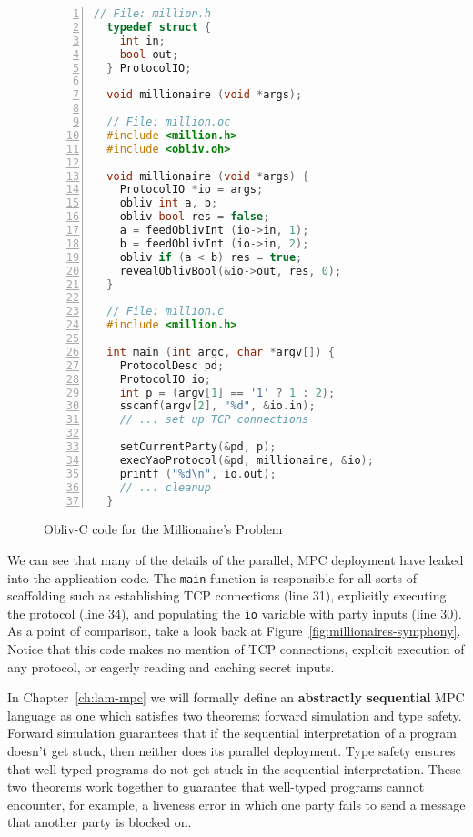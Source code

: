 \begin{figure}[h]
\begin{lstlisting}[language=c,basicstyle=\footnotesize\ttfamily,numbers=left,stepnumber=1]
  // File: million.h
  typedef struct {
    int in;
    bool out;
  } ProtocolIO;

  void millionaire (void *args);

  // File: million.oc
  #include <million.h>
  #include <obliv.oh>

  void millionaire (void *args) {
    ProtocolIO *io = args;
    obliv int a, b;
    obliv bool res = false;
    a = feedOblivInt (io->in, 1);
    b = feedOblivInt (io->in, 2);
    obliv if (a < b) res = true;
    revealOblivBool(&io->out, res, 0);
  }

  // File: million.c
  #include <million.h>

  int main (int argc, char *argv[]) {
    ProtocolDesc pd;
    ProtocolIO io;
    int p = (argv[1] == '1' ? 1 : 2);
    sscanf(argv[2], "%d", &io.in);
    // ... set up TCP connections

    setCurrentParty(&pd, p);
    execYaoProtocol(&pd, millionaire, &io);
    printf ("%d\n", io.out);
    // ... cleanup
  }
\end{lstlisting}
\caption{Obliv-C code for the Millionaire's Problem}
\label{fig:millionaires-oblivc}
\end{figure}

We can see that many of the details of the parallel, MPC deployment have leaked into the application code. The
\lstinline[language=c,basicstyle=\ttfamily]{main} function is responsible for all sorts of scaffolding such as establishing TCP connections (line 31),
explicitly executing the protocol (line 34), and populating the \lstinline[language=c,basicstyle=\ttfamily]{io} variable with party inputs (line 30). As
a point of comparison, take a look back at Figure~\ref{fig:millionaires-symphony}. Notice that this code makes no mention of TCP connections,
explicit execution of any protocol, or eagerly reading and caching secret inputs.

In Chapter~\ref{ch:lam-mpc} we will formally define an \textbf{abstractly sequential} MPC language as one which satisfies two theorems:
forward simulation and type safety. Forward simulation guarantees that if the sequential interpretation of a program doesn't get stuck,
then neither does its parallel deployment. Type safety ensures that well-typed programs do not get stuck in the sequential interpretation.
These two theorems work together to guarantee that well-typed programs cannot encounter, for example, a liveness error in which one party
fails to send a message that another party is blocked on.

